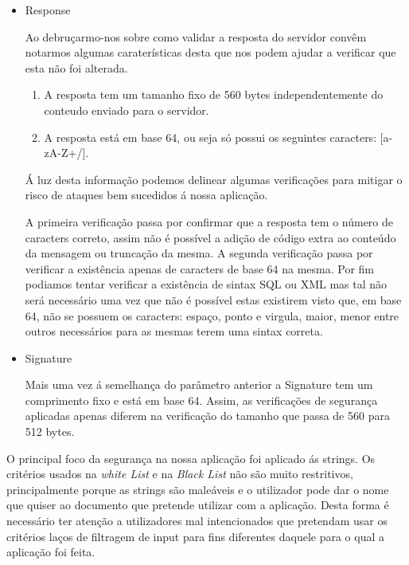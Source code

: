 \begin{itemize}
\hfill\newline
\item Response\newline

\par Ao debruçarmo-nos sobre como validar a resposta do servidor convêm notarmos algumas caraterísticas desta que nos podem ajudar a verificar que esta não foi alterada. 
\begin{enumerate}
	\item A resposta tem um tamanho fixo de 560 bytes independentemente do conteudo enviado para o servidor.
	\item A resposta está em base 64, ou seja só possui os seguintes caracters: [a-zA-Z+/].
\end{enumerate}

\par Á luz desta informação podemos delinear algumas verificações para mitigar o risco de ataques bem sucedidos á nossa aplicação.
\par A primeira verificação passa por confirmar que a resposta tem o número de caracters correto, assim não é possível a adição de código extra ao conteúdo da mensagem ou truncação da mesma. A segunda verificação passa por verificar a existência apenas de caracters de base 64 na mesma. Por fim podiamos tentar verificar a existência de sintax SQL ou XML mas tal não será necessário uma vez que não é possível estas existirem visto que, em base 64, não se possuem os caracters: espaço, ponto e virgula, maior, menor entre outros necessários para as mesmas terem uma sintax correta.


\hfill\newline
\item Signature\newline

Mais uma vez á semelhança do parâmetro anterior a Signature tem um comprimento fixo e está em base 64. Assim, as verificações de segurança aplicadas apenas diferem na verificação do tamanho que passa de 560 para 512 bytes.


\end{itemize}


O principal foco da segurança na nossa aplicação foi aplicado ás strings. Os critérios usados na \textit{white List} e na \textit{Black List} não são muito restritivos, principalmente porque as strings são maleáveis e o utilizador pode dar o nome que quiser ao documento que pretende utilizar com a aplicação. Desta forma é necessário ter atenção a utilizadores mal intencionados que pretendam usar os critérios laços de filtragem de input para fins diferentes daquele para o qual a aplicação foi feita.\newline


